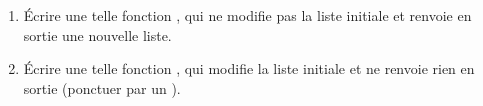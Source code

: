 \begin{enumerate}[label=\emph{\alph*)}]
  \item \'Ecrire une telle fonction , qui ne modifie pas la liste initiale et renvoie en sortie une nouvelle liste.
  \item \'Ecrire une telle fonction , qui modifie la liste initiale et ne renvoie rien en sortie (ponctuer par un ).
\end{enumerate}